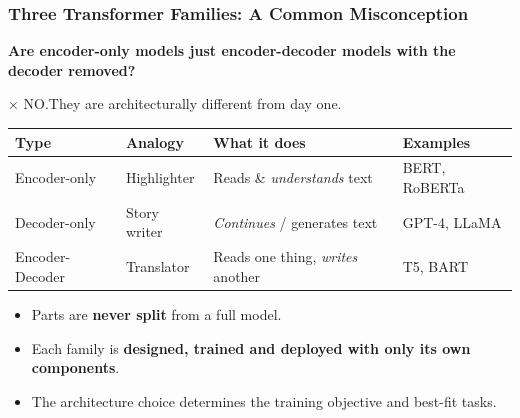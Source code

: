 \begin{frame}[fragile]\frametitle{Three Transformer Families: A Common Misconception}
\textbf{Are encoder-only models just encoder-decoder models with the decoder removed?}\\[0.6em]
\begin{center}
\large\color{red}$\times$ NO.\quad\color{black}They are architecturally different from day one.
\end{center}
\vspace{0.4em}
\begin{center}
\small
\renewcommand{\arraystretch}{1.3}
\begin{tabular}{|l|l|l|l|}
\hline
\textbf{Type} & \textbf{Analogy} & \textbf{What it does} & \textbf{Examples} \\
\hline
Encoder-only    & Highlighter   & Reads \& \emph{understands} text & BERT, RoBERTa \\
Decoder-only    & Story writer  & \emph{Continues} / generates text & GPT-4, LLaMA \\
Encoder-Decoder & Translator    & Reads one thing, \emph{writes} another & T5, BART \\
\hline
\end{tabular}
\end{center}
\vspace{0.4em}
\begin{itemize}
\item Parts are \textbf{never split} from a full model.
\item Each family is \textbf{designed, trained and deployed with only its own components}.
\item The architecture choice determines the training objective and best-fit tasks.
\end{itemize}
\end{frame}



